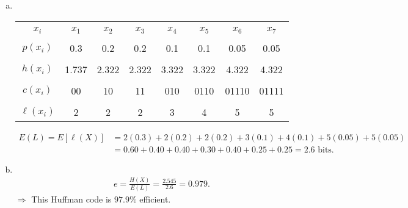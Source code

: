 \documentclass[12pt]{article}
\begin{document}
{\begin{minipage}[t]{0.98\textwidth}
\begin{enumerate}[a)]
\begin{align*}
\end{align*}
\item \quad\\[-1.3cm]
\begin{center}
\begin{tabular}{|c|ccccccc|}
\hline
&&&&&&& \\[-0.4cm]
$x_i$     & $x_1$ & $x_2$ & $x_3$ & $x_4$ & $x_5$ & $x_6$ & $x_7$ \\[0.1cm]
\hline
&&&&&&& \\[-0.4cm]
$p(x_i)$  & 0.3 & 0.2 & 0.2 & 0.1 & 0.1 & 0.05 & 0.05 \\[0.1cm]
\hline
&&&&&&& \\[-0.4cm]
$h(x_i)$  & 1.737 & 2.322 & 2.322 & 3.322 & 3.322 & 4.322 & 4.322 \\[0.1cm]
\hline
&&&&&&& \\[-0.4cm]
$c(x_i)$  & 00 & 10 & 11 & 010 & 0110 & 01110 & 01111 \\[0.1cm]
\hline
&&&&&&& \\[-0.4cm]
$\ell(x_i)$  & 2 & 2 & 2 & 3 & 4 & 5 & 5 \\[0.1cm]
\hline
\end{tabular}
\end{center}
\begin{align*}
E(L) = E[\ell(X)] &= 2(0.3) + 2(0.2) + 2(0.2) + 3(0.1) + 4(0.1) + 5(0.05) + 5(0.05) \\
&=  0.60 + 0.40 + 0.40 + 0.30 + 0.40 + 0.25 + 0.25
 = 2.6  \text{ bits}.
\end{align*}
\item \quad \\[-1.45cm]
\begin{align*}
e = \frac{H(X)}{E(L)} = \frac{2.545}{2.6} = 0.979.
\end{align*}
$\Rightarrow$ This Huffman code is $97.9\%$ efficient.
\end{enumerate}
\end{minipage}}\vspace{0.03\textwidth}
\end{document}

